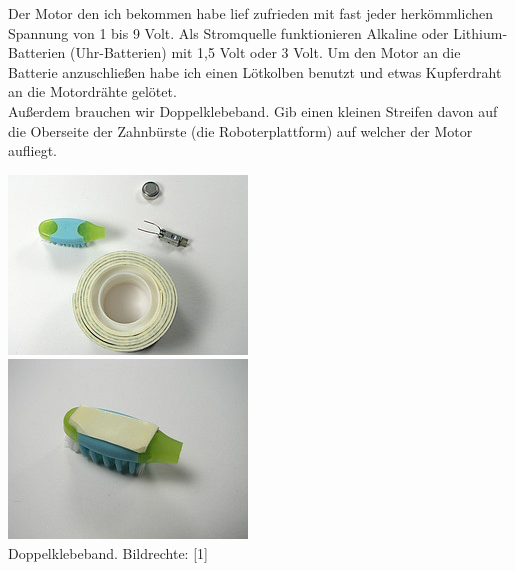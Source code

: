 Der Motor den ich bekommen habe lief zufrieden mit fast jeder herkömmlichen Spannung von 1 bis 9 Volt. Als Stromquelle funktionieren Alkaline oder Lithium-Batterien (Uhr-Batterien) mit 1,5 Volt oder 3 Volt. Um den Motor an die Batterie anzuschließen habe ich einen Lötkolben benutzt und etwas Kupferdraht an die Motordrähte gelötet.
\\ 

Außerdem brauchen wir Doppelklebeband. Gib einen kleinen Streifen davon auf die Oberseite der Zahnbürste (die Roboterplattform) auf welcher der Motor aufliegt. \\ 

\begin{center}
\includegraphics[width=\linewidth]{bristlebot/bristlebot8.jpg}\\
\includegraphics[width=\linewidth]{bristlebot/bristlebot9.jpg}\\
\footnotesize{Doppelklebeband. Bildrechte: [1]}
\end{center}


